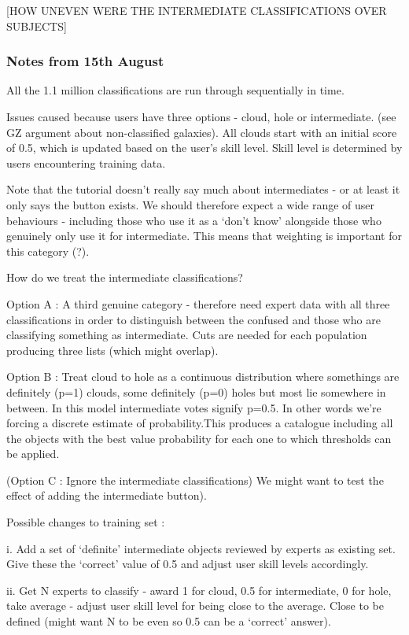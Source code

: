 \documentclass[a4,useAMS,usenatbib]{mn2e}
\begin{document}
[HOW UNEVEN WERE THE INTERMEDIATE CLASSIFICATIONS OVER SUBJECTS]




\subsubsection{Notes from 15th August}

All the 1.1 million classifications are run through sequentially in time.

Issues caused because users have three options - cloud, hole or intermediate. (see GZ argument about non-classified galaxies). All clouds start with an initial score of 0.5, which is updated based on the user's skill level. Skill level is determined by users encountering training data. 

Note that the tutorial doesn't really say much about intermediates - or at least it only says the button exists. We should therefore expect a wide range of user behaviours - including those who use it as a `don't know' alongside those who genuinely only use it for intermediate. This means that weighting is important for this category (?). 

How do we treat the intermediate classifications? 

	Option A : A third genuine category - therefore need expert data with all three classifications in order to distinguish between the confused and those who are classifying something as intermediate. Cuts are needed for each population producing three lists (which might overlap). 
	
	Option B : Treat cloud to hole as a continuous distribution where somethings are definitely (p=1) clouds, some definitely (p=0) holes but most lie somewhere in between. In this model intermediate votes signify p=0.5. In other words we're forcing a discrete estimate of probability.This produces a catalogue including all the objects with the best value probability for each one to which thresholds can be applied. 
	
	(Option C : Ignore the intermediate classifications) We might want to test the effect of adding the intermediate button). 
	
	Possible changes to training set :
	
		i. Add a set of `definite' intermediate objects reviewed by experts as existing set. Give these the `correct' value of 0.5 and adjust user skill levels accordingly.
		
		ii. Get N experts to classify - award 1 for cloud, 0.5 for intermediate, 0 for hole, take average - adjust user skill level for being close to the average. Close to be defined (might want N to be even so 0.5 can be a `correct' answer). 
		
\end{document}

